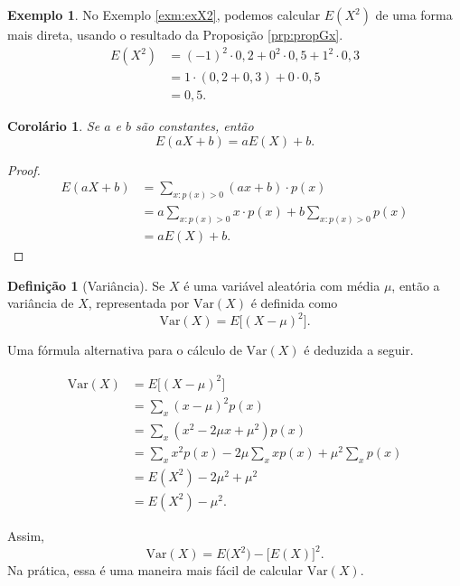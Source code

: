\documentclass[]{book}
\newtheorem{corollary}{Corolário}[chapter]
\theoremstyle{definition}
\newtheorem{definition}{Definição}[chapter]
\theoremstyle{definition}
\newtheorem{example}{Exemplo}[chapter]
\theoremstyle{definition}
\theoremstyle{remark}
\begin{document}
\begin{example}
\protect\hypertarget{exm:unnamed-chunk-143}{}{\label{exm:unnamed-chunk-143} }No Exemplo \ref{exm:exX2}, podemos calcular \(E(X^2)\) de uma forma mais direta, usando o resultado da Proposição \ref{prp:propGx}.
\begin{align}
E(X^2) &= (-1)^2\cdot 0{,}2 + 0^2\cdot 0{,}5 + 1^2\cdot 0{,}3\\
&= 1\cdot(0{,}2+0{,}3) + 0\cdot 0{,}5\\
&= 0{,}5.
\end{align}
\end{example}

\begin{corollary}
\protect\hypertarget{cor:corEsperanca}{}{\label{cor:corEsperanca} }Se \(a\) e \(b\) são constantes, então \[E(aX+b) = aE(X)+b.\]
\end{corollary}

\begin{proof}
\iffalse{} {Prova. } \fi{}\begin{align}
E(aX+b) &= \sum_{x:p(x)>0}(ax+b)\cdot p(x)\\
&=a\sum_{x:p(x)>0}x \cdot p(x) + b\sum_{x:p(x)>0}p(x)\\
&= aE(X) + b.
\end{align}
\end{proof}

\begin{definition}[Variância]
\protect\hypertarget{def:unnamed-chunk-145}{}{\label{def:unnamed-chunk-145} \iffalse (Variância) \fi{} }Se \(X\) é uma variável aleatória com média \(\mu\), então a variância de \(X\), representada por \(\mathrm{Var}(X)\) é definida como
\[\mathrm{Var}(X) = E\big[(X-\mu)^2\big].\]
\end{definition}

Uma fórmula alternativa para o cálculo de \(\mathrm{Var}(X)\) é deduzida a seguir.

\begin{align}
\mathrm{Var}(X) &= E\big[(X-\mu)^2\big] \\
&= \sum_x (x-\mu)^2p(x) \\
&= \sum_x (x^2 - 2\mu x + \mu^2)p(x)\\
&= \sum_x x^2p(x) - 2\mu\sum_x xp(x) + \mu^2\sum_x p(x)\\
&= E(X^2) - 2\mu^2 + \mu^2\\
&= E(X^2) - \mu^2.
\end{align}

Assim,
\[\mathrm{Var}(X) = E\big(X^2\big)-\big[E(X)\big]^2.\]
Na prática, essa é uma maneira mais fácil de calcular \(\mathrm{Var}(X)\).
\end{document}
